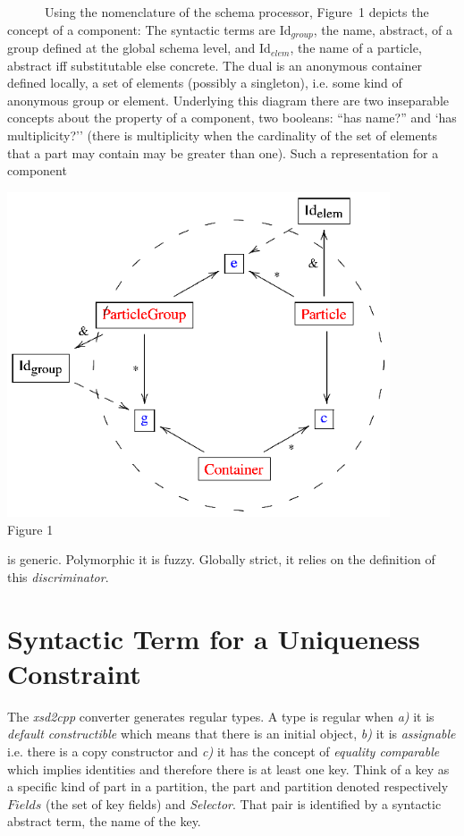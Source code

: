 \noindent
\begin{minipage}[h]{7.0cm}
~~~~~~Using the nomenclature of the schema processor, Figure~1 depicts the concept of a component: The syntactic terms are Id$_{group}$, the name, abstract, of a group defined at the global schema level, and Id$_{elem}$, the name of a particle, abstract iff substitutable else concrete. The dual is an anonymous container defined locally, a set of  elements (possibly a singleton), i.e. some kind of anonymous group or element. Underlying this diagram there are two inseparable concepts about the property of a component, two booleans: ``has name?'' and `has multiplicity?'' (there is multiplicity when the cardinality of the set of elements that a part may contain may be greater than one). Such a representation for a component
\end{minipage}
\begin{minipage}[h]{7.0cm}
 \begin{center}
 \includegraphics[width=0.85\textwidth]{part8/Viallefond_P52/P52_1.eps}
 \\\small{Figure 1}
 \end{center}

\end{minipage}
\hfill
 is generic. Polymorphic it is fuzzy. Globally strict, it relies on the definition of this 
{\it discriminator}.


\section{Syntactic Term for a Uniqueness Constraint} 
The {\it xsd2cpp} converter generates regular types. A type is regular when
{\it a)} it is  {\it default constructible} which means that there is an initial object,
{\it b)} it is {\it assignable} i.e. there is a copy constructor and 
{\it c)} it has the concept of  {\it equality comparable} which implies identities and therefore there is at least one key. Think of a  key as a specific kind of part in a partition, the part and partition denoted respectively $Fields$ (the set of key fields) and \textit{Selector}. That pair is identified by a syntactic abstract term, the name of the key.

